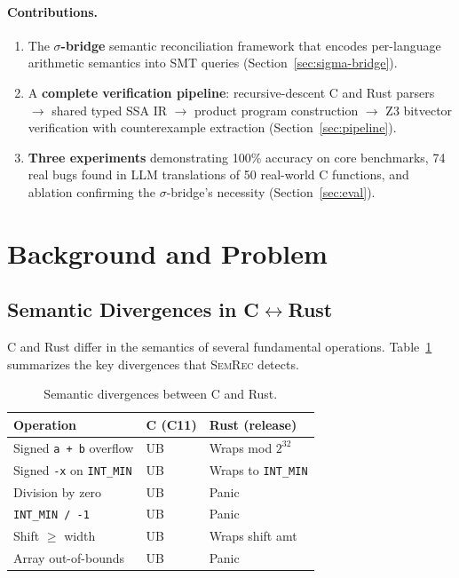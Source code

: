 \documentclass[11pt,a4paper]{article}
\begin{document}
\paragraph{Contributions.}
\begin{enumerate}[leftmargin=*]
  \item The \textbf{$\sigma$-bridge} semantic reconciliation framework that
    encodes per-language arithmetic semantics into SMT queries
    (Section~\ref{sec:sigma-bridge}).
  \item A \textbf{complete verification pipeline}: recursive-descent C and
    Rust parsers $\to$ shared typed SSA IR $\to$ product program construction
    $\to$ Z3 bitvector verification with counterexample extraction
    (Section~\ref{sec:pipeline}).
  \item \textbf{Three experiments} demonstrating 100\% accuracy on core
    benchmarks, 74 real bugs found in LLM translations of 50 real-world
    C functions, and ablation confirming the $\sigma$-bridge's necessity
    (Section~\ref{sec:eval}).
\end{enumerate}


\section{Background and Problem}\label{sec:background}

\subsection{Semantic Divergences in C$\leftrightarrow$Rust}

C and Rust differ in the semantics of several fundamental operations.
Table~\ref{tab:divergences} summarizes the key divergences that
\textsc{SemRec} detects.

\begin{table}[t]
\centering
\small
\caption{Semantic divergences between C and Rust.}
\label{tab:divergences}
\begin{tabular}{@{}lll@{}}
\toprule
Operation & C (C11) & Rust (release) \\
\midrule
Signed \texttt{a + b} overflow & UB & Wraps mod $2^{32}$ \\
Signed \texttt{-x} on \texttt{INT\_MIN} & UB & Wraps to \texttt{INT\_MIN} \\
Division by zero & UB & Panic \\
\texttt{INT\_MIN / -1} & UB & Panic \\
Shift $\geq$ width & UB & Wraps shift amt \\
Array out-of-bounds & UB & Panic \\
\bottomrule
\end{tabular}
\end{table}
\end{document}
